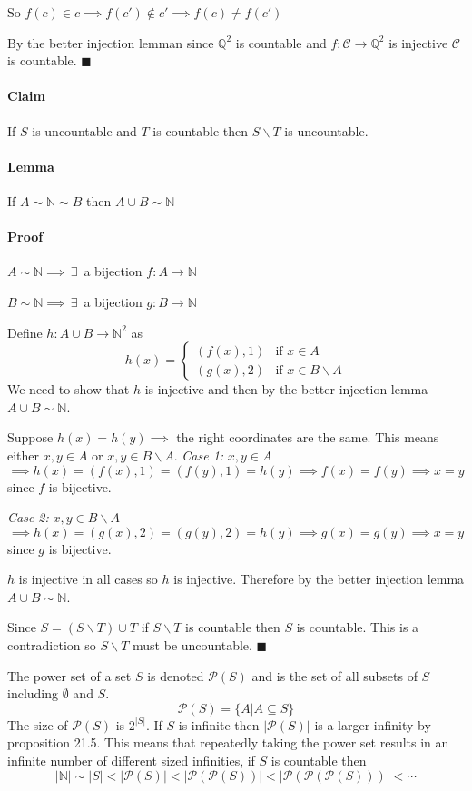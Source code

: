 \documentclass{article}
\newcommand{\bb}[1]{\mathbb{#1}}
\newcommand{\E}{\,\exists\,}
\begin{document}
So \(f(c)\in c\implies f(c')\not\in c'\implies f(c)\ne f(c')\)

By the better injection lemman since \(\bb Q^2\) is countable and \(f:\mathcal C\to \bb Q^2\) is injective \(\mathcal C\) is countable. \(\blacksquare\)

\paragraph{Claim} If \(S\) is uncountable and \(T\) is countable then \(S\backslash T\) is uncountable.

\paragraph{Lemma} If \(A\sim\bb N\sim B\) then \(A\cup B\sim\bb N\)

\paragraph{Proof} \(A\sim\bb N\implies\E\) a bijection \(f:A\to\bb N\)

\(B\sim\bb N\implies\E\) a bijection \(g:B\to\bb N\)

Define \(h:A\cup B\to\bb N^2\) as
\[h(x)=\left\{
\begin{array}{cc}
(f(x),1) & \text{if }x\in A\\
(g(x),2) & \text{if }x\in B\backslash A
\end{array}
\right.\]
We need to show that \(h\) is injective and then by the better injection lemma \(A\cup B\sim\bb N\).

Suppose \(h(x)=h(y)\implies\) the right coordinates are the same. This means either \(x,y\in A\) or \(x,y\in B\backslash A\).
\emph{Case 1:} \(x,y\in A\)
\[\implies h(x)=(f(x),1)=(f(y),1)=h(y)\implies f(x)=f(y)\implies x=y\]
since \(f\) is bijective.

\emph{Case 2:} \(x,y\in B\backslash A\)
\[\implies h(x)=(g(x),2)=(g(y),2)=h(y)\implies g(x)=g(y)\implies x=y\]
since \(g\) is bijective.

\(h\) is injective in all cases so \(h\) is injective. Therefore by the better injection lemma \(A\cup B\sim\bb N\). 

Since \(S=(S\backslash T)\cup T\) if \(S\backslash T\) is countable then \(S\) is countable. This is a contradiction so \(S\backslash T\) must be uncountable. \(\blacksquare\)

The power set of a set \(S\) is denoted \(\mathcal P(S)\) and is the set of all subsets of \(S\) including \(\emptyset\) and \(S\).
\[\mathcal P(S)=\{A|A\subseteq S\}\]
The size of \(\mathcal P(S)\) is \(2^{|S|}\). If \(S\) is infinite then \(|\mathcal P(S)|\) is a larger infinity by proposition 21.5. This means that repeatedly taking the power set results in an infinite number of different sized infinities, if \(S\) is countable then
\[|\bb N|\sim|S|<|\mathcal P(S)|<|\mathcal P(\mathcal P(S))|<|\mathcal P(\mathcal P(\mathcal P(S)))|<\dotsb\]
\end{document}
